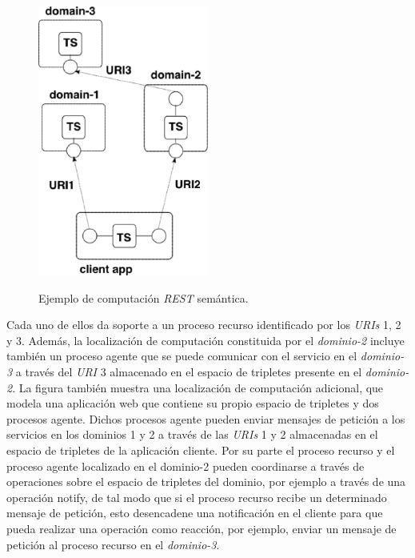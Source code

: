 \begin{figure}
\vspace{2.4in}
\caption{Ejemplo de computaci\'on \textit{REST} sem\'antica.}
\includegraphics[width=0.5\textwidth]{figura1}
\label{figura1}
\end{figure}

Cada uno de ellos da soporte a un proceso recurso identificado por los \textit{URIs} 1, 2 y 3. Adem\'as, la localizaci\'on de computaci\'on constituida por el \textit{dominio-2} incluye tambi\'en un proceso agente que se puede comunicar con el servicio en el \textit{dominio-3} a trav\'es del \textit{URI} 3 almacenado en el espacio de tripletes presente en el \textit{dominio-2}. La figura tambi\'en muestra una localizaci\'on de computaci\'on adicional, que modela una aplicaci\'on web que contiene su propio espacio de tripletes y dos procesos agente. Dichos procesos agente pueden enviar mensajes de petici\'on a los servicios en los dominios 1 y 2 a trav\'es de las \textit{URIs} 1 y 2 almacenadas en el espacio de tripletes de la aplicaci\'on cliente. Por su parte el proceso recurso y el proceso agente localizado en el dominio-2 pueden coordinarse a trav\'es de operaciones sobre el espacio de tripletes del dominio,  por ejemplo a trav\'es de una operaci\'on notify, de tal modo que si el proceso recurso recibe un determinado mensaje de petici\'on, esto desencadene una notificaci\'on en el cliente para que pueda realizar una operaci\'on como reacci\'on, por ejemplo, enviar un mensaje de petici\'on al proceso recurso en el \textit{dominio-3}.


